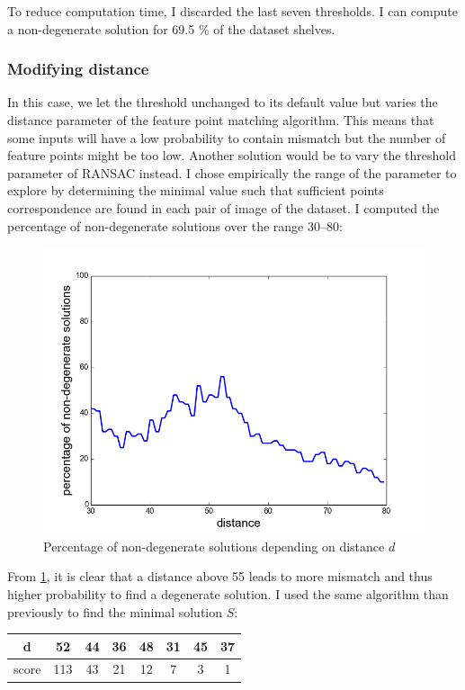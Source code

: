 \documentclass[11pt]{report}
\begin{document}
To reduce computation time, I discarded the last seven thresholds. I can compute a non-degenerate solution for 69.5 \% of the dataset shelves.

\subsubsection{Modifying distance}

In this case, we let the threshold unchanged to its default value but varies the distance parameter of the feature point matching algorithm. This means that some inputs will have a low probability to contain mismatch but the number of feature points might be too low. Another solution would be to vary the threshold parameter of RANSAC instead.
I chose empirically the range of the parameter to explore by determining the minimal value such that sufficient points correspondence are found in each pair of image of the dataset. I computed the percentage of non-degenerate solutions over the range 30--80:

\begin{figure}[H]
	\centering
	\includegraphics[scale=0.7]{images/ransac-d.png}
    \caption{Percentage of non-degenerate solutions depending on distance $d$}
    \label{fig:ransac-distance}
\end{figure}

From \ref{fig:ransac-distance}, it is clear that a distance above 55 leads to more mismatch and thus higher probability to find a degenerate solution.
I used the same algorithm than previously to find the minimal solution $S$:

\begin{center}
\begin{tabular}{|c|c|c|c|c|c|c|c|}
\hline
d & 52 & 44 & 36 & 48 & 31 & 45 & 37 \\
\hline
score & 113 & 43 & 21 & 12 & 7 & 3 & 1 \\
\hline
\end{tabular}
\end{center}
\end{document}
